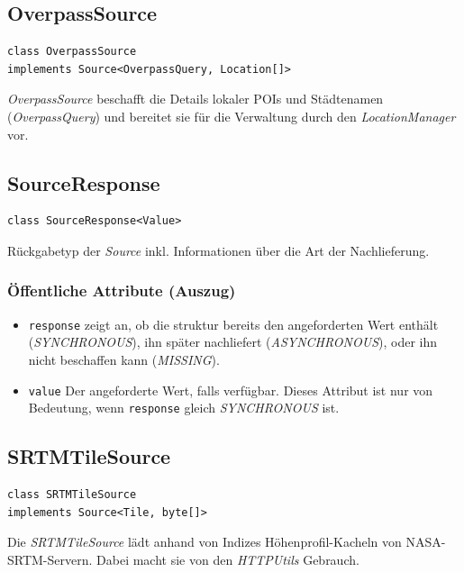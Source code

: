 \documentclass[10pt]{scrreprt}
\begin{document}
\pagebreak
\subsection*{OverpassSource}
\begin{lstlisting}
class OverpassSource
implements Source<OverpassQuery, Location[]>
\end{lstlisting}
\textit{OverpassSource} beschafft die Details lokaler POIs und Städtenamen (\textit{OverpassQuery}) und bereitet sie für die Verwaltung durch den \textit{LocationManager} vor.\\

\vspace{5mm}
\subsection*{SourceResponse}
\begin{lstlisting}
class SourceResponse<Value>
\end{lstlisting}
Rückgabetyp der \textit{Source} inkl. Informationen über die Art der Nachlieferung.\\
\subsubsection*{Öffentliche Attribute (Auszug)}
\begin{itemize}
\item\texttt{response} zeigt an, ob die struktur bereits den angeforderten Wert enthält (\textit{SYNCHRONOUS}), ihn später nachliefert (\textit{ASYNCHRONOUS}), oder ihn nicht beschaffen kann (\textit{MISSING}).
\item\texttt{value} Der angeforderte Wert, falls verfügbar. Dieses Attribut ist nur von Bedeutung, wenn \texttt{response} gleich \textit{SYNCHRONOUS} ist.
\end{itemize}

\vspace{5mm}
\subsection*{SRTMTileSource}
\begin{lstlisting}
class SRTMTileSource
implements Source<Tile, byte[]>
\end{lstlisting}
Die \textit{SRTMTileSource} lädt anhand von Indizes Höhenprofil-Kacheln von NASA-SRTM-Servern. Dabei macht sie von den \textit{HTTPUtils} Gebrauch.\\
\end{document}
